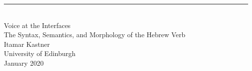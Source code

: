\singlespacing
\begin{center}
\rule{165pt}{0pt} \\
\vspace{1cm}
\LARGE{Voice at the Interfaces}\\
\vspace{1cm}
\Large{The Syntax, Semantics, and Morphology of the Hebrew Verb}\\
\vspace{2cm}
\large{Itamar Kastner} \\
\vspace{0.4cm}
\normalsize{University of Edinburgh} \\
\vspace{1cm}
\normalsize{January 2020} %

\end{center}
